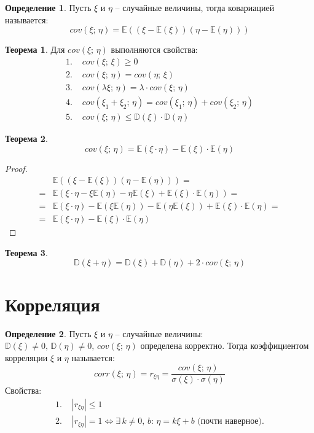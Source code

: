 \documentclass[12pt]{article}
\theoremstyle{definition}
\newtheorem{theorem}{Теорема}[section]
\newtheorem{definition}{Определение}
\newcommand{\E}{\mathbb{E}}
\newcommand{\D}{\mathbb{D}}
\begin{document}
\begin{definition}
    Пусть $\xi$ и $\eta$ -- случайные величины, тогда ковариацией называется:
    $$cov(\xi;\,\eta)=\E((\xi-\E(\xi))(\eta-\E(\eta)))$$
\end{definition}
\begin{theorem}
    Для $cov(\xi;\,\eta)$ выполняются свойства:
    \begin{align*}
        1.\,\,&cov(\xi;\,\xi)\geq0\\
        2.\,\,&cov(\xi;\,\eta)=cov(\eta;\,\xi)\\
        3.\,\,&cov(\lambda \xi;\,\eta)=\lambda\cdot cov(\xi;\,\eta)\\
        4.\,\,&cov(\xi_1+\xi_2;\,\eta)=cov(\xi_1;\,\eta)+cov(\xi_2;\,\eta)\\
        5.\,\,&cov(\xi;\,\eta)\leq \D(\xi)\cdot\D(\eta)
    \end{align*}
\end{theorem}
\begin{theorem}
    $$cov(\xi;\,\eta)=\E(\xi\cdot\eta)-\E(\xi)\cdot\E(\eta)$$
\end{theorem}
\begin{proof}
    \begin{align*}
        &\E((\xi-\E(\xi))(\eta-\E(\eta)))=\\
        =&\E(\xi\cdot\eta-\xi\E(\eta)-\eta\E(\xi)+\E(\xi)\cdot\E(\eta))=\\
        =&\E(\xi\cdot\eta)-\E(\xi\E(\eta))-\E(\eta\E(\xi))+\E(\xi)\cdot\E(\eta)=\\
        =&\E(\xi\cdot\eta)-\E(\xi)\cdot\E(\eta)
    \end{align*}
\end{proof}
\begin{theorem}
    $$\D(\xi+\eta)=\D(\xi)+\D(\eta)+2\cdot cov(\xi;\,\eta)$$
\end{theorem}
\section{Корреляция}

\begin{definition}
    Пусть $\xi$ и $\eta$ -- случайные величины: $\D(\xi)\neq0,\,\D(\eta)\neq0,\,cov(\xi;\,\eta)$ определена корректно. Тогда коэффициентом корреляции $\xi$ и $\eta$ называется:
    $$corr(\xi;\,\eta)=r_{\xi\eta}=\frac{cov(\xi;\,\eta)}{\sigma(\xi)\cdot\sigma(\eta)}$$
    Свойства:
    \begin{align*}
        1.\,\,&|r_{\xi\eta}|\leq 1\\
        2.\,\,&|r_{\xi\eta}|=1\Longleftrightarrow \exists\, k\neq 0,\,b:\,\eta=k\xi+b\text{ (почти наверное).}
    \end{align*}
\end{definition}
\end{document}
